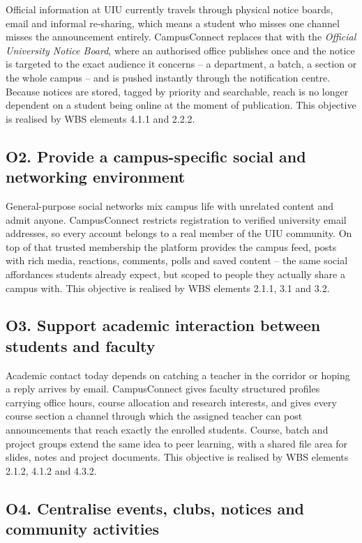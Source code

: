 \documentclass[11pt,a4paper]{report}
\begin{document}
Official information at UIU currently travels through physical notice boards,
email and informal re-sharing, which means a student who misses one channel
misses the announcement entirely. CampusConnect replaces that with the
\emph{Official University Notice Board}, where an authorised office publishes
once and the notice is targeted to the exact audience it concerns -- a
department, a batch, a section or the whole campus -- and is pushed instantly
through the notification centre. Because notices are stored, tagged by priority
and searchable, reach is no longer dependent on a student being online at the
moment of publication. This objective is realised by WBS elements 4.1.1 and
2.2.2.

\subsection*{O2. Provide a campus-specific social and networking environment}

General-purpose social networks mix campus life with unrelated content and admit
anyone. CampusConnect restricts registration to verified university email
addresses, so every account belongs to a real member of the UIU community. On
top of that trusted membership the platform provides the campus feed, posts with
rich media, reactions, comments, polls and saved content -- the same social
affordances students already expect, but scoped to people they actually share a
campus with. This objective is realised by WBS elements 2.1.1, 3.1 and 3.2.

\subsection*{O3. Support academic interaction between students and faculty}

Academic contact today depends on catching a teacher in the corridor or hoping a
reply arrives by email. CampusConnect gives faculty structured profiles carrying
office hours, course allocation and research interests, and gives every course
section a channel through which the assigned teacher can post announcements that
reach exactly the enrolled students. Course, batch and project groups extend the
same idea to peer learning, with a shared file area for slides, notes and
project documents. This objective is realised by WBS elements 2.1.2, 4.1.2 and
4.3.2.

\subsection*{O4. Centralise events, clubs, notices and community activities}
\end{document}
